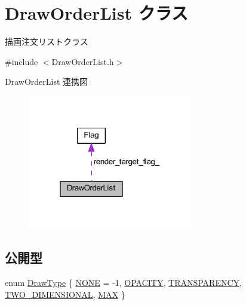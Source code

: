 \hypertarget{class_draw_order_list}{}\section{Draw\+Order\+List クラス}
\label{class_draw_order_list}


描画注文リストクラス  




{\ttfamily \#include $<$Draw\+Order\+List.\+h$>$}



Draw\+Order\+List 連携図\nopagebreak
\begin{figure}[H]
\begin{center}
\leavevmode
\includegraphics[width=205pt]{class_draw_order_list__coll__graph}
\end{center}
\end{figure}
\subsection*{公開型}
\begin{DoxyCompactItemize}
\item 
enum \mbox{\hyperlink{class_draw_order_list_a6c9b9ceb312c16d399ef355f4f3486bb}{Draw\+Type}} \{ \newline
\mbox{\hyperlink{class_draw_order_list_a6c9b9ceb312c16d399ef355f4f3486bbab2a83851af51b7cbf059ef9522ab908f}{N\+O\+NE}} = -\/1, 
\mbox{\hyperlink{class_draw_order_list_a6c9b9ceb312c16d399ef355f4f3486bba4c769c665704d5a6d9a3fa1fa34966fb}{O\+P\+A\+C\+I\+TY}}, 
\mbox{\hyperlink{class_draw_order_list_a6c9b9ceb312c16d399ef355f4f3486bba38e4ff40be41d3ca753da42d6a628173}{T\+R\+A\+N\+S\+P\+A\+R\+E\+N\+CY}}, 
\mbox{\hyperlink{class_draw_order_list_a6c9b9ceb312c16d399ef355f4f3486bba3e5454163533de348e3b3a819e75eb6c}{T\+W\+O\+\_\+\+D\+I\+M\+E\+N\+S\+I\+O\+N\+AL}}, 
\newline
\mbox{\hyperlink{class_draw_order_list_a6c9b9ceb312c16d399ef355f4f3486bba6af2a2923ac1094762cf45ca43fc12ab}{M\+AX}}
 \}
\end{DoxyCompactItemize}
